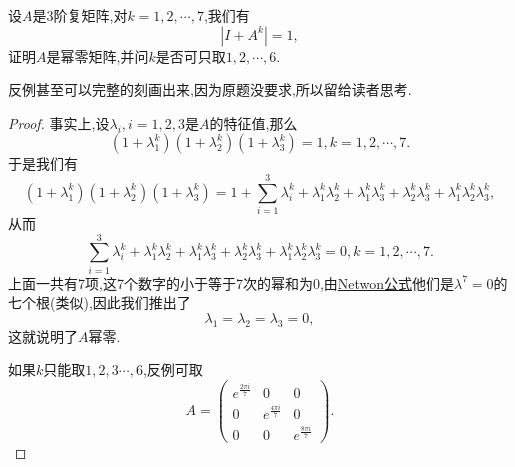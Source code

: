 \documentclass[../../main.tex]{subfiles}%
\begin{document}
\begin{example}\label{example:例题028}
设\( A \)是3阶复矩阵,对\( k = 1,2,\cdots,7 \),我们有
\[
|I + A^k| = 1,
\]
证明\( A \)是幂零矩阵,并问\( k \)是否可只取\( 1,2,\cdots,6 \).
\end{example}
\begin{note}
反例甚至可以完整的刻画出来,因为原题没要求,所以留给读者思考.
\end{note}
\begin{proof}

事实上,设\( \lambda_i,i = 1,2,3 \)是\( A \)的特征值,那么
\[
(1 + \lambda_1^k)(1 + \lambda_2^k)(1 + \lambda_3^k) = 1,k = 1,2,\cdots,7.
\]
于是我们有
\[
(1 + \lambda_1^k)(1 + \lambda_2^k)(1 + \lambda_3^k) = 1 + \sum_{i = 1}^3 \lambda_i^k + \lambda_1^k\lambda_2^k + \lambda_1^k\lambda_3^k + \lambda_2^k\lambda_3^k + \lambda_1^k\lambda_2^k\lambda_3^k,
\]
从而
\[
\sum_{i = 1}^3 \lambda_i^k + \lambda_1^k\lambda_2^k + \lambda_1^k\lambda_3^k + \lambda_2^k\lambda_3^k + \lambda_1^k\lambda_2^k\lambda_3^k = 0,k = 1,2,\cdots,7.
\]
上面一共有7项,这7个数字的小于等于7次的幂和为0,由\hyperref[theorem:Netwon公式]{Netwon公式}他们是\( \lambda^7 = 0 \)的七个根(类似),因此我们推出了
\[
\lambda_1 = \lambda_2 = \lambda_3 = 0,
\]
这就说明了\( A \)幂零.

如果\( k \)只能取\( 1,2,3\cdots,6 \),反例可取
\[
A = \begin{pmatrix}
e^{\frac{2\pi i}{7}} & 0 & 0 \\
0 & e^{\frac{4\pi i}{7}} & 0 \\
0 & 0 & e^{\frac{8\pi i}{7}}
\end{pmatrix}.
\]

\end{proof}
\end{document}
